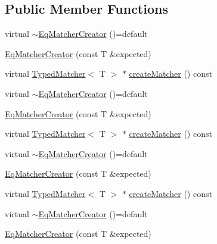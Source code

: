 \subsection*{Public Member Functions}
\begin{DoxyCompactItemize}
\item 
virtual \mbox{\hyperlink{structfakeit_1_1internal_1_1EqMatcherCreator_acfe924d6373829891b5d0f53d88486f1}{$\sim$\+Eq\+Matcher\+Creator}} ()=default
\item 
\mbox{\hyperlink{structfakeit_1_1internal_1_1EqMatcherCreator_a0d1520f92d7a9eaa115022bb46f0ae3e}{Eq\+Matcher\+Creator}} (const T \&expected)
\item 
virtual \mbox{\hyperlink{structfakeit_1_1TypedMatcher}{Typed\+Matcher}}$<$ T $>$ $\ast$ \mbox{\hyperlink{structfakeit_1_1internal_1_1EqMatcherCreator_a0ab880ca3aa803487b6cbb418bc2ccfc}{create\+Matcher}} () const
\item 
virtual \mbox{\hyperlink{structfakeit_1_1internal_1_1EqMatcherCreator_acfe924d6373829891b5d0f53d88486f1}{$\sim$\+Eq\+Matcher\+Creator}} ()=default
\item 
\mbox{\hyperlink{structfakeit_1_1internal_1_1EqMatcherCreator_a0d1520f92d7a9eaa115022bb46f0ae3e}{Eq\+Matcher\+Creator}} (const T \&expected)
\item 
virtual \mbox{\hyperlink{structfakeit_1_1TypedMatcher}{Typed\+Matcher}}$<$ T $>$ $\ast$ \mbox{\hyperlink{structfakeit_1_1internal_1_1EqMatcherCreator_a0ab880ca3aa803487b6cbb418bc2ccfc}{create\+Matcher}} () const
\item 
virtual \mbox{\hyperlink{structfakeit_1_1internal_1_1EqMatcherCreator_acfe924d6373829891b5d0f53d88486f1}{$\sim$\+Eq\+Matcher\+Creator}} ()=default
\item 
\mbox{\hyperlink{structfakeit_1_1internal_1_1EqMatcherCreator_a0d1520f92d7a9eaa115022bb46f0ae3e}{Eq\+Matcher\+Creator}} (const T \&expected)
\item 
virtual \mbox{\hyperlink{structfakeit_1_1TypedMatcher}{Typed\+Matcher}}$<$ T $>$ $\ast$ \mbox{\hyperlink{structfakeit_1_1internal_1_1EqMatcherCreator_a0ab880ca3aa803487b6cbb418bc2ccfc}{create\+Matcher}} () const
\item 
virtual \mbox{\hyperlink{structfakeit_1_1internal_1_1EqMatcherCreator_acfe924d6373829891b5d0f53d88486f1}{$\sim$\+Eq\+Matcher\+Creator}} ()=default
\item 
\mbox{\hyperlink{structfakeit_1_1internal_1_1EqMatcherCreator_a0d1520f92d7a9eaa115022bb46f0ae3e}{Eq\+Matcher\+Creator}} (const T \&expected)
\item 

\end{DoxyCompactItemize}
